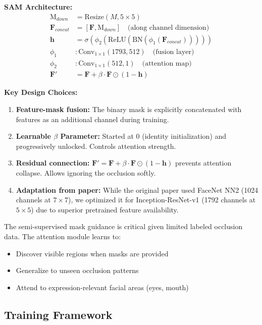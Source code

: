 \documentclass[10pt,twocolumn]{article}
\begin{document}
\textbf{SAM Architecture:}
\begin{align}
\text{M}_{down} &= \text{Resize}(M, 5 \times 5) \\
\mathbf{F}_{concat} &= [\mathbf{F}, \text{M}_{down}] \quad \text{(along channel dimension)} \\
\mathbf{h} &= \sigma(\phi_2(\text{ReLU}(\text{BN}(\phi_1(\mathbf{F}_{concat}))))) \\
\phi_1 &: \text{Conv}_{1 \times 1}(1793, 512) \quad \text{(fusion layer)} \\
\phi_2 &: \text{Conv}_{1 \times 1}(512, 1) \quad \text{(attention map)} \\
\mathbf{F}' &= \mathbf{F} + \beta \cdot \mathbf{F} \odot (1 - \mathbf{h})
\end{align}

\textbf{Key Design Choices:}
\begin{enumerate}
    \item \textbf{Feature-mask fusion:} The binary mask is explicitly concatenated with features as an additional channel during training.
    \item \textbf{Learnable $\beta$ Parameter:} Started at 0 (identity initialization) and progressively unlocked. Controls attention strength.
    \item \textbf{Residual connection:} $\mathbf{F}' = \mathbf{F} + \beta \cdot \mathbf{F} \odot (1 - \mathbf{h})$ prevents attention collapse. Allows ignoring the occlusion softly.
    \item \textbf{Adaptation from paper:} While the original paper used FaceNet NN2 (1024 channels at $7 \times 7$), we optimized it for Inception-ResNet-v1 (1792 channels at $5 \times 5$) due to superior pretrained feature availability.
\end{enumerate}

The semi-supervised mask guidance is critical given limited labeled occlusion data. The attention module learns to:
\begin{itemize}
    \item Discover visible regions when masks are provided
    \item Generalize to unseen occlusion patterns
    \item Attend to expression-relevant facial areas (eyes, mouth)
\end{itemize}

\subsection{Training Framework}
\end{document}
